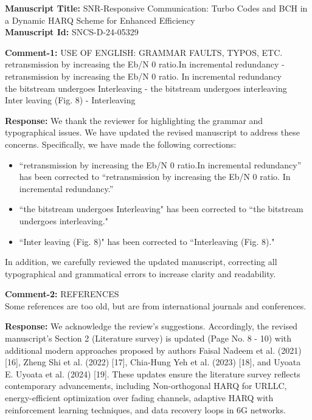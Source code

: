 \documentclass[a4paper,10pt]{article}
\begin{document}
\noindent \textbf{Manuscript Title:} SNR-Responsive Communication: Turbo Codes and BCH in a Dynamic HARQ Scheme for Enhanced Efficiency \\

\noindent \textbf{Manuscript Id:} SNCS-D-24-05329 \\

\begin{enumerate}

{\color{blue} \item \textbf{Comment-1:} USE OF ENGLISH: GRAMMAR FAULTS, TYPOS, ETC.\\
retransmission by increasing the Eb/N 0 ratio.In incremental redundancy -\> retransmission by increasing the Eb/N 0 ratio. In incremental redundancy \\
the bitstream undergoes Interleaving -\> the bitstream undergoes interleaving \\ 
Inter leaving (Fig. 8) -\> Interleaving }

\textbf{Response:} We thank the reviewer for highlighting the grammar and typographical issues. We have updated the revised manuscript to address these concerns. Specifically, we have made the following corrections:

\begin{itemize}
    \item ``retransmission by increasing the Eb/N 0 ratio.In incremental redundancy'' has been corrected to ``retransmission by increasing the Eb/N 0 ratio. In incremental redundancy.''
    \item ``the bitstream undergoes Interleaving" has been corrected to ``the bitstream undergoes interleaving."
    \item ``Inter leaving (Fig. 8)" has been corrected to ``Interleaving (Fig. 8)."
\end{itemize}

In addition, we carefully reviewed the updated manuscript, correcting all typographical and grammatical errors to increase clarity and readability.


{\color{blue} \item \textbf{Comment-2:} REFERENCES \\
Some references are too old, but are from international journals and conferences.}

\textbf{Response:} We acknowledge the review's suggestions. Accordingly, the revised manuscript's Section 2 (Literature survey) is updated (Page No. 8 - 10) with additional modern approaches proposed by authors Faisal Nadeem et al. (2021) [16], Zheng Shi et al. (2022) [17], Chia-Hung Yeh et al. (2023) [18], and Uyoata E. Uyoata et al. (2024) [19]. These updates ensure the literature survey reflects contemporary advancements, including Non-orthogonal HARQ for URLLC, energy-efficient optimization over fading channels, adaptive HARQ with reinforcement learning techniques, and data recovery loops in 6G networks.

\end{enumerate}
\end{document}
